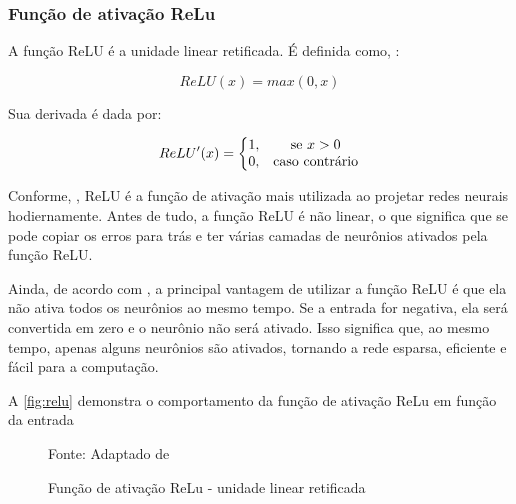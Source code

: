 \subsubsection{Função de ativação ReLu}
A função ReLU é a unidade linear retificada. É definida como, :

\begin{equation}\label{relu}
	ReLU(x) = max(0,x)
\end{equation}

Sua derivada é dada por:

\begin{equation}\label{derivada_relu}
	ReLU'(x) = \left \{ \begin{matrix} 1, & \mbox{se }x > 0 \\ 
	0, & \mbox{\textrm{caso contrário}} \end{matrix} \right.
\end{equation}

Conforme, , ReLU é a função de ativação mais utilizada ao projetar redes neurais hodiernamente. Antes de tudo, a função ReLU é não linear, o que significa que se pode copiar os erros para trás e ter várias camadas de neurônios ativados pela função ReLU. 

Ainda, de acordo com , a principal vantagem de utilizar a função ReLU é que ela não ativa todos os neurônios ao mesmo tempo. Se a entrada for negativa, ela será convertida em zero e o neurônio não será ativado. Isso significa que, ao mesmo tempo, apenas alguns neurônios são ativados, tornando a rede esparsa, eficiente e fácil para a computação.

A \autoref{fig:relu} demonstra o comportamento da função de ativação ReLu em função da entrada

\begin{figure}[h!]
	\centering
	\caption{Função de ativação ReLu - unidade linear retificada}
	
	{\scriptsize 	Fonte: Adaptado de }
	\label{fig:relu}
\end{figure}

